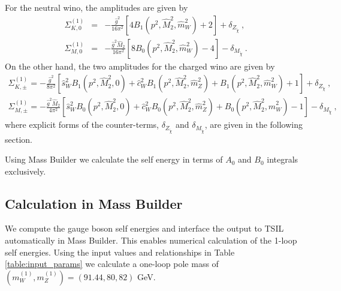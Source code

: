 \documentclass[11pt]{article}
\begin{document}
For the neutral wino, the amplitudes are given by
{
\begin{eqnarray}
\Sigma_{K, 0}^{(1)} &=&
-\frac{\hat{g}^2}{16\pi^2}
\left[ 4 B_1(p^2, \hat{M}_2^2, \hat{m}_W^2) + 2 \right]
+\delta_{Z_{\tilde{\chi}}}\ , \label{eq: Neu_K} \\
\Sigma_{M, 0}^{(1)} &=&
-\frac{\hat{g}^2 \hat{M}_2}{16\pi^2}
\left[ 8 B_0(p^2, \hat{M}_2^2, \hat{m}_W^2) - 4 \right]
-\delta_{M_{\tilde{\chi}}}\ . \label{eq: Neu_M}
\end{eqnarray}
}On the other hand, the two amplitudes for the charged wino are given by
{
\begin{eqnarray}
\Sigma_{K, \pm}^{(1)} =
-\frac{\hat{g}^2}{8\pi^2}
\left[ \hat{s}_W^2 B_1(p^2,\hat{M}_2^2,0)
+\hat{c}_W^2 B_1(p^2,\hat{M}_2^2, \hat m_Z^2)
+B_1(p^2, \hat{M}_2^2, \hat{m}_W^2) + 1  \right]
+ \delta_{Z_{\tilde{\chi}}}\ , \label{eq: Cha_K} \\
\Sigma_{M, \pm}^{(1)} =
-\frac{\hat{g}^2 \hat{M}_2}{4\pi^2}
\left[ \hat{s}_W^2 B_0(p^2, \hat{M}_2^2,0)
+\hat{c}_W^2 B_0(p^2, \hat{M}_2^2, \hat{m}_Z^2)
+B_0(p^2, \hat{M}_2^2, \hat{m}_W^2) - 1 \right]
-\delta_{M_{\tilde{\chi}}}\ ,
 \label{eq: Cha_M}
\end{eqnarray}
}where explicit forms of the counter-terms, $\delta_{Z_{\tilde{\chi}}}$ and $\delta_{M_{\tilde{\chi}}}$, are given in the following section.

Using Mass Builder we calculate the self energy in terms of $A_0$ and $B_0$ integrals exclusively.



\subsection{Calculation in Mass Builder}

We compute the gauge boson self energies and interface the output to TSIL automatically in Mass Builder.  This enables numerical calculation of the 1-loop self energies.  Using the input values and relationships in Table \ref{table:input_params} we calculate a one-loop pole mass of $(m_W^{(1)},m_Z^{(1)}) = (91.44,80,82)$ GeV.
\end{document}
